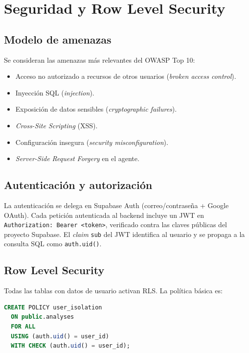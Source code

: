 \chapter{Seguridad y Row Level Security}\label{cap:seguridad}

\section{Modelo de amenazas}

Se consideran las amenazas más relevantes del OWASP Top 10:

\begin{itemize}[leftmargin=*,itemsep=0.2em]
  \item Acceso no autorizado a recursos de otros usuarios
        (\emph{broken access control}).
  \item Inyección SQL (\emph{injection}).
  \item Exposición de datos sensibles (\emph{cryptographic failures}).
  \item \emph{Cross-Site Scripting} (XSS).
  \item Configuración insegura (\emph{security misconfiguration}).
  \item \emph{Server-Side Request Forgery} en el agente.
\end{itemize}

\section{Autenticación y autorización}

La autenticación se delega en Supabase Auth (correo/contraseña +
Google OAuth). Cada petición autenticada al backend incluye un JWT en
\texttt{Authorization: Bearer <token>}, verificado contra las claves
públicas del proyecto Supabase. El \emph{claim} \texttt{sub} del JWT
identifica al usuario y se propaga a la consulta SQL como
\texttt{auth.uid()}.

\section{Row Level Security}

Todas las tablas con datos de usuario activan RLS. La política básica
es:

\begin{lstlisting}[language=SQL,caption={Politica RLS por usuario.}]
CREATE POLICY user_isolation
  ON public.analyses
  FOR ALL
  USING (auth.uid() = user_id)
  WITH CHECK (auth.uid() = user_id);
\end{lstlisting}

